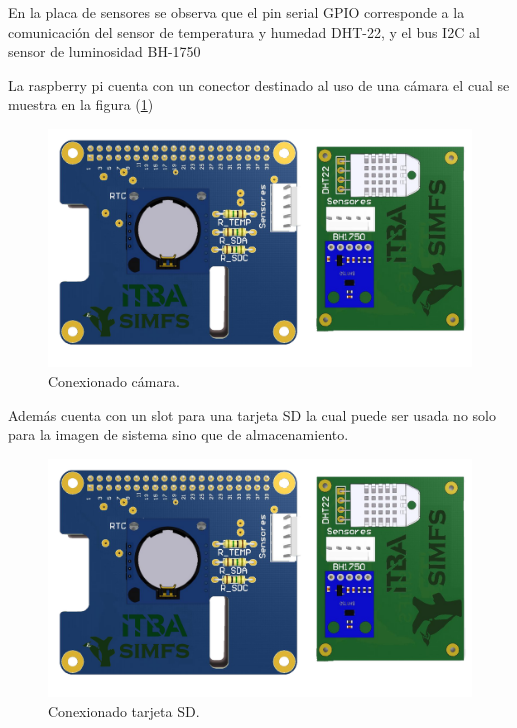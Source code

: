 En la placa de sensores se observa que el pin serial GPIO corresponde a la comunicación del sensor de temperatura y humedad DHT-22, y el bus I2C al sensor de luminosidad BH-1750

La raspberry pi cuenta con un conector destinado al uso de una cámara el cual se muestra en la figura (\ref{fig:rpiFront})
\begin{figure}[H]
	\centering
	\includegraphics[width=\linewidth,page=3]{ImagenesIngenieria de Detalle/RPI}		
	\caption{Conexionado cámara.}
	\label{fig:rpiFront}
\end{figure}
Además cuenta con un slot para una tarjeta SD la cual puede ser usada no solo para la imagen de sistema sino que de almacenamiento.
\begin{figure}[H]
	\centering
	\includegraphics[width=0.9\linewidth,page=2]{ImagenesIngenieria de Detalle/RPI}		
	\caption{Conexionado tarjeta SD.}
	\label{fig:rpiBack}
\end{figure}

